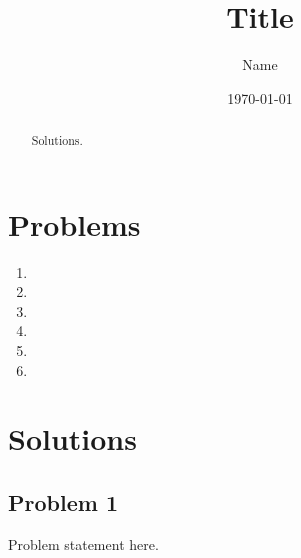 \documentclass[11pt]{scrartcl}
\title{Title}
\author{Name}
\date{\today}
\begin{document}
\maketitle

\begin{abstract}
Solutions.
\end{abstract}

\tableofcontents
\newpage

\addtocounter{section}{-1}

\section{Problems}

\begin{enumerate}[\bfseries 1.]

\item

\item

\item

\item

\item

\item

\end{enumerate}

\pagebreak








\section{Solutions}

\subsection{Problem 1}

\begin{tcolorbox}[purplebox,title={Problem statement}]
Problem statement here.
\end{tcolorbox}

\begin{claim*}
\end{claim*}
\end{document}
